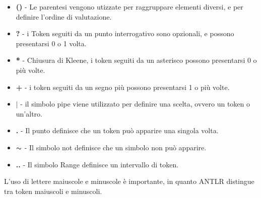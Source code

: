 \documentclass[../../main.tex]{subfiles}
\begin{document}
\begin{itemize}
    \item \textbf{()} - Le parentesi vengono utizzate per raggruppare elementi diversi, e per definire l'ordine di valutazione.
    \item \textbf{?} - i Token seguiti da un punto interrogativo sono opzionali, e possono presentarsi 0 o 1 volta.
    \item \textbf{*} - Chiusura di Kleene, i token seguiti da un asterisco possono presentarsi 0 o più volte.
    \item \textbf{+} - i token seguiti da un segno più possono presentarsi 1 o più volte.
    \item \textbf{$\vert $} - il simbolo pipe viene utilizzato per definire una scelta, ovvero un token o un'altro.
    \item \textbf{.} - Il punto definisce che un token può apparire una singola volta.
    \item \textbf{$\thicksim$ } - Il simbolo not definisce che un simbolo non può apparire.
    \item \textbf{..} - Il simbolo Range definisce un intervallo di token.
\end{itemize}
L'uso di lettere maiuscole e minuscole è importante, in quanto ANTLR distingue tra token maiuscoli e minuscoli.\autocite{amslaurea2372}\\
\end{document}

